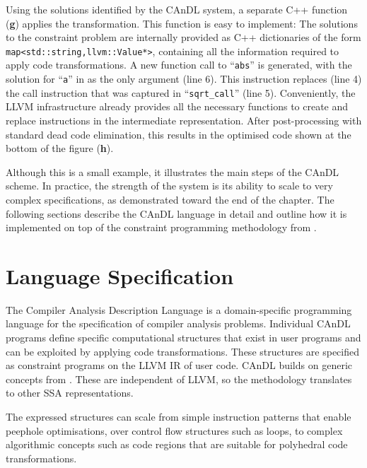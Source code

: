     
    Using the solutions identified by the CAnDL system, a separate C++ function
    ({\bf g}) applies the transformation.
    This function is easy to implement:
    The solutions to the constraint problem are internally provided as C++
    dictionaries of the form \texttt{map<std::string,llvm::Value*>},
    containing all the information required to apply code transformations.
    A new function call to ``\texttt{abs}'' is generated, with the solution for
    ``\texttt{a}'' in  as the only argument (line 6).
    This instruction replaces (line 4) the call instruction that was captured
    in ``\texttt{sqrt\_call}'' (line 5).
    Conveniently, the LLVM infrastructure already provides all the necessary
    functions to create and replace instructions in the intermediate
    representation.
    After post-processing with standard dead code elimination, this results in
    the optimised code shown at the bottom of the figure ({\bf h}).

    Although this is a small example, it illustrates the main steps of the
    CAnDL scheme.
    In practice, the strength of the system is its ability to scale to very
    complex specifications, as demonstrated toward the end of the chapter.
    The following sections describe the CAnDL language in detail and outline
    how it is implemented on top of the constraint programming methodology
    from .

\begin{figure}[p]
    
    \label{fig:candlexample}
\end{figure}

\section{Language Specification}

    The Compiler Analysis Description Language is a domain-specific
    programming language for the specification of compiler analysis problems. 
    Individual CAnDL programs define specific computational structures that
    exist in user programs and can be exploited by applying code
    transformations.
    These structures are specified as constraint programs on the LLVM IR
    of user code.
    CAnDL builds on generic concepts from .
    These are independent of LLVM, so the methodology translates to other SSA
    representations.

    The expressed structures can scale from simple instruction patterns that
    enable peephole optimisations, over control flow structures such as loops,
    to complex algorithmic concepts such as code regions that are suitable for
    polyhedral code transformations.

